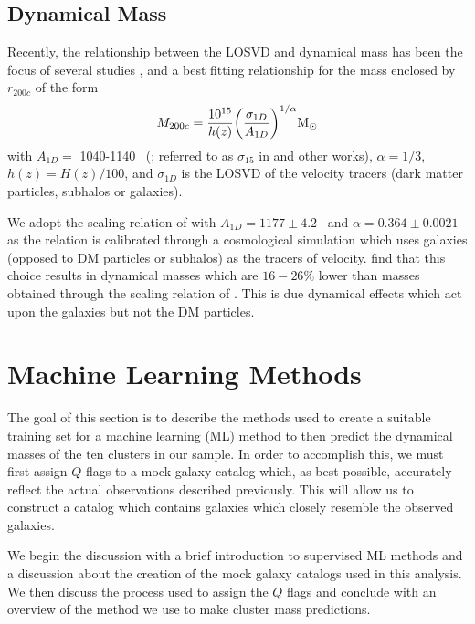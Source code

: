 \subsection{Dynamical Mass} 
Recently, the relationship between the LOSVD and dynamical mass has been the focus of several studies , and a best fitting relationship for the mass enclosed by $r_{200c}$ of the form 
\begin{equation}\label{eq:power law}
	M_{200c} = \frac{10^{15}}{h(z)} \bigg{(}\frac{\sigma_{1D}}{A_{1D}} \bigg{)}^{1/\alpha} \hbox{$\mathrm{M}_\odot$} 
\end{equation}
with $A_{1D} =$ 1040-1140 \kms\ (\citealt{Munari2013}; referred to as $\sigma_{15}$ in \citealt{Evrard2008} and other works), $\alpha = 1/3$, $h(z) = H(z)/100$, and $\sigma_{1D}$ is the LOSVD of the velocity tracers (dark matter particles, subhalos or galaxies).

We adopt the scaling relation of \cite{Munari2013} with $A_{1D} = 1177\pm4.2$ \kms\ and $\alpha = 0.364\pm 0.0021$ as the relation is calibrated through a cosmological simulation which uses galaxies (opposed to DM particles or subhalos) as the tracers of velocity. \cite{Kirk2015} find that this choice results in dynamical masses which are $16-26\%$ lower than masses obtained through the scaling relation of \cite{Evrard2008}. This is due dynamical effects which act upon the galaxies but not the DM particles. 

\section{Machine Learning Methods}\label{sec:ML methods}
The goal of this section is to describe the methods used to create a suitable training set for a machine learning (ML) method to then predict the dynamical masses of the ten clusters in our sample. In order to accomplish this, we must first assign $Q$ flags to a mock galaxy catalog which, as best possible, accurately reflect the actual observations described previously. This will allow us to construct a catalog which contains galaxies which closely resemble the observed galaxies.

We begin the discussion with a brief introduction to supervised ML methods and a discussion about the creation of the mock galaxy catalogs used in this analysis. We then discuss the process used to assign the $Q$ flags and conclude with an overview of the method we use to make cluster mass predictions.

